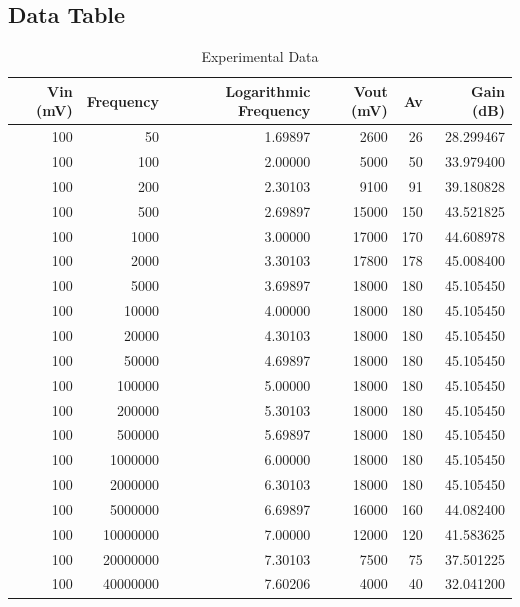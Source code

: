 \documentclass[12pt]{article}
\begin{document}
\subsection{Data Table}

\begin{table}[h!]
    \centering
    \caption{Experimental Data}
    \begin{tabular}{rrrrrr}
        \hline
        Vin (mV) &  Frequency &  Logarithmic Frequency &  Vout (mV) &  Av &  Gain (dB) \\
        \hline
        100 &         50 &                1.69897 &       2600 &  26 &  28.299467 \\
        100 &        100 &                2.00000 &       5000 &  50 &  33.979400 \\
        100 &        200 &                2.30103 &       9100 &  91 &  39.180828 \\
        100 &        500 &                2.69897 &      15000 & 150 &  43.521825 \\
        100 &       1000 &                3.00000 &      17000 & 170 &  44.608978 \\
        100 &       2000 &                3.30103 &      17800 & 178 &  45.008400 \\
        100 &       5000 &                3.69897 &      18000 & 180 &  45.105450 \\
        100 &      10000 &                4.00000 &      18000 & 180 &  45.105450 \\
        100 &      20000 &                4.30103 &      18000 & 180 &  45.105450 \\
        100 &      50000 &                4.69897 &      18000 & 180 &  45.105450 \\
        100 &     100000 &                5.00000 &      18000 & 180 &  45.105450 \\
        100 &     200000 &                5.30103 &      18000 & 180 &  45.105450 \\
        100 &     500000 &                5.69897 &      18000 & 180 &  45.105450 \\
        100 &    1000000 &                6.00000 &      18000 & 180 &  45.105450 \\
        100 &    2000000 &                6.30103 &      18000 & 180 &  45.105450 \\
        100 &    5000000 &                6.69897 &      16000 & 160 &  44.082400 \\
        100 &   10000000 &                7.00000 &      12000 & 120 &  41.583625 \\
        100 &   20000000 &                7.30103 &       7500 &  75 &  37.501225 \\
        100 &   40000000 &                7.60206 &       4000 &  40 &  32.041200 \\
        \hline
    \end{tabular}
\end{table}
\end{document}
